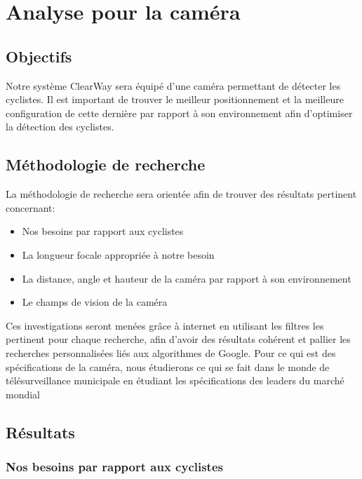 
\section{Analyse pour la caméra}
\label{sec:camera}

\subsection{Objectifs}
\label{sec:camera_Objectifs}

Notre système ClearWay sera équipé d'une caméra permettant de détecter les cyclistes. 
Il est important de trouver le meilleur positionnement et la meilleure configuration de cette dernière par rapport à son environnement afin d'optimiser la détection des cyclistes. 

\subsection{Méthodologie de recherche}
\label{sec:camera_Methodo}

La méthodologie de recherche sera orientée afin de trouver des résultats pertinent concernant:
\begin{itemize}
    \item Nos besoins par rapport aux cyclistes
    \item La longueur focale appropriée à notre besoin
    \item La distance, angle et hauteur de la caméra par rapport à son environnement
    \item Le champs de vision de la caméra
\end{itemize}
Ces investigations seront menées grâce à internet en utilisant les filtres les pertinent pour chaque recherche, afin d'avoir des 
résultats cohérent et pallier les recherches personnalisées liés aux algorithmes de Google.
Pour ce qui est des spécifications de la caméra, nous étudierons ce qui se fait dans le monde de télésurveillance municipale en étudiant les spécifications des leaders du marché mondial

\subsection{Résultats}
\label{sec:camera_resultats}

\subsubsection{Nos besoins par rapport aux cyclistes}
\label{sec:camera_cycliste}

